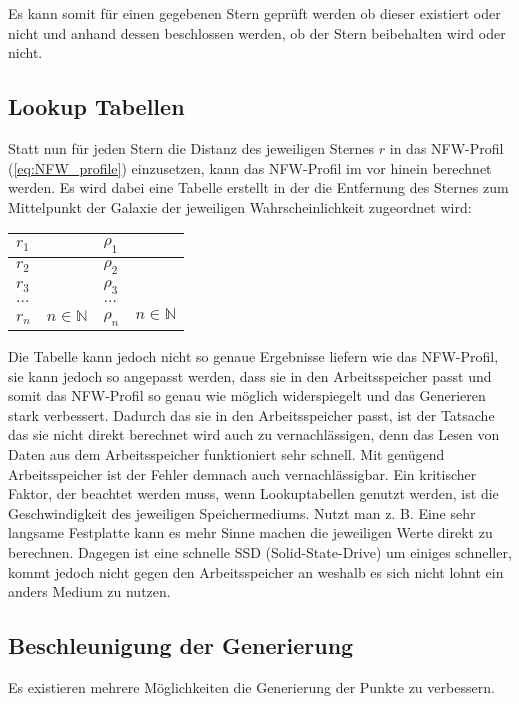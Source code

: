 Es kann somit für einen gegebenen Stern geprüft werden ob dieser existiert oder
nicht und anhand dessen beschlossen werden, ob der Stern beibehalten wird oder
nicht.

\subsection{Lookup Tabellen}
Statt nun für jeden Stern die Distanz des jeweiligen Sternes \( r \) in das
NFW-Profil (\ref{eq:NFW_profile}) einzusetzen, kann das NFW-Profil im vor hinein
berechnet werden. Es wird dabei eine Tabelle erstellt in der die Entfernung des
Sternes zum Mittelpunkt der Galaxie der jeweiligen Wahrscheinlichkeit
zugeordnet wird:

\begin{center}
\begin{tabular} {l | l}
\( r_1 \) & \( \rho_1 \) \\ \hline
\( r_2 \) & \( \rho_2 \) \\ \hline
\( r_3 \) & \( \rho_3 \) \\ \hline
\( \dots \) & \( \dots \) \\ \hline
\( r_n \quad n \in \mathbb{N} \) & \( \rho_n \quad n \in \mathbb{N} \) \\ \hline
\end{tabular}
\end{center}

Die Tabelle kann jedoch nicht so genaue Ergebnisse liefern wie das NFW-Profil,
sie kann jedoch so angepasst werden, dass sie in den Arbeitsspeicher passt und
somit das NFW-Profil so genau wie möglich widerspiegelt und das Generieren
stark verbessert. Dadurch das sie in den Arbeitsspeicher passt, ist der Tatsache
das sie nicht direkt berechnet wird auch zu vernachlässigen, denn das Lesen von
Daten aus dem Arbeitsspeicher funktioniert sehr schnell. Mit genügend
Arbeitsspeicher ist der Fehler demnach auch vernachlässigbar. Ein kritischer
Faktor, der beachtet werden muss, wenn Lookuptabellen genutzt werden, ist die
Geschwindigkeit des jeweiligen Speichermediums. Nutzt man z. B. Eine sehr
langsame Festplatte kann es mehr Sinne machen die jeweiligen Werte direkt zu
berechnen. Dagegen ist eine schnelle SSD (Solid-State-Drive) um einiges
schneller, kommt jedoch nicht gegen den Arbeitsspeicher an weshalb es sich
nicht lohnt ein anders Medium zu nutzen.

\subsection{Beschleunigung der Generierung}
Es existieren mehrere Möglichkeiten die Generierung der Punkte zu verbessern.

